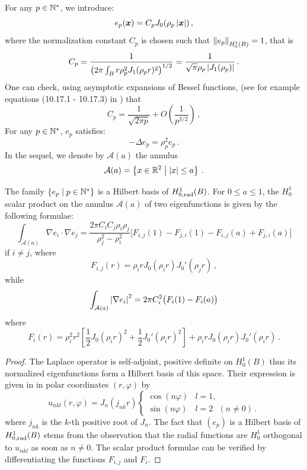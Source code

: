 \documentclass[main]{subfiles}
\begin{document}
\noindent For any $p\in \mathbb{N}^*$, we introduce:
\[e_p(\boldsymbol{x}) = C_p J_0(\rho_p \left\lvert \boldsymbol{x} \right\rvert)\,,\]
where the normalization constant $C_p$ is chosen such that $\left\|e_p\right\|_{H^1_0(B)} = 1$, that is  
\[C_p = \dfrac{1}{\left(2\pi \int_B  r \rho_p^2 J_1 (\rho_p r)^2\right)^{1/2}} = \dfrac{1}{\sqrt{\pi}\rho_p\left\lvert J_1(\rho_p) \right\rvert}\,.\]
One can check, using asymptotic expansions of Bessel functions, (see for example equations  (10.17.1 - 10.17.3) in \cite{NIST:DLMF}) that
\begin{equation}
\label{estimCp}
C_p = \dfrac{1}{\sqrt{2 \pi p}} + O\left(\frac{1}{p^{3/2}}\right)\,, 
\end{equation}
\noindent For any $p \in \mathbb{N}^*$, $e_p$ satisfies:
\begin{equation}
\label{epEstUnVP}
-\Delta e_p = \rho_p^2 e_p\,.
\end{equation}
In the sequel, we denote by $\mathcal{A}(a)$ the annulus 
\[\mathcal{A}(a) = \left\{x\in \mathbb{R}^2\mathrel{}\middle|\mathrel{}\left\lvert x \right\rvert \leq a\right\}\,.\]
\begin{theorem} 
	\label{epEstUneBaseDeHilbert}
	The family $\left\{e_p \mid p\in \mathbb{N}^*\right\}$ is a Hilbert basis of $H^1_{0,\textup{rad}}(B)$. For $0 \leq a \leq 1$, the $H^1_0$ scalar product on the annulus $\mathcal{A}(a)$ of two eigenfunctions is given by the following formulae:
	\[ \int_{\mathcal{A}(a) } \nabla e_i \cdot \nabla e_j = \frac{2\pi C_i C_j \rho_i \rho_j}{\rho_j^2 - \rho_i^2}\bigg[F_{i,j}(1) - F_{j,i}(1) - F_{i,j}(a) + F_{j,i}(a)\bigg]\]
	if $i \neq j$, 
	where 
	\[	 F_{i,j}(r) =  \rho_i r J_0(\rho_i r)J_0'(\rho_j r)\,,\]
	while
	\begin{equation*}
	\int_{\mathcal{A}(a) } \left\lvert  \nabla e_i \right\rvert^2 = 2\pi C_i^2 \big(F_i(1) - F_i(a)\big)
	\end{equation*}
	where 
	\[F_i(r) = \rho_i^2r^2\left[\dfrac{1}{2}J_0(\rho_ir)^2 + \frac{1}{2}J_0'(\rho_ir)^2\right] + \rho_irJ_0(\rho_i r)J_0'(\rho_ir)\,.\]
\end{theorem}
\begin{proof}
	The Laplace operator is self-adjoint, positive definite on $H_0^1(B)$ thus its normalized eigenfunctions form a Hilbert basis of this space. Their expression is given in \cite[Eq. (3.9)]{grebenkov2013geometrical} in polar coordinates $(r,\varphi)$ by
	\[u_{nkl}(r,\varphi) = J_n(j_{nk}r ) \begin{cases}
	\cos(n\varphi) & l = 1,\\
	\sin(n\varphi) & l = 2 \text{ } (n \neq 0)\,.
	\end{cases}\]
	where $j_{nk}$ is the $k$-th positive root of $J_n$. The fact that $(e_p)$ is a Hilbert basis of $H^1_{0,\textup{rad}}(B)$ stems from the observation that the radial functions are $H^1_0$ orthogonal to $u_{nkl}$ as soon as $n \neq 0$. The scalar product formulae can be verified by differentiating the functions $F_{i,j}$ and $F_i$. 
	
\end{proof}
\end{document}
